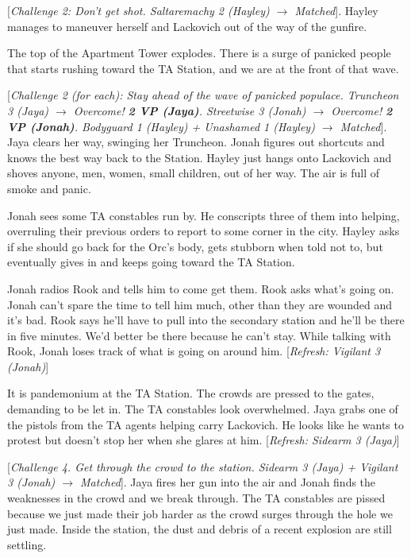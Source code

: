 {[}\textit{Challenge 2: Don't get shot.  Saltaremachy 2 (Hayley) $\rightarrow$ Matched}{]}.  Hayley manages to maneuver herself and Lackovich out of the way of the gunfire.



The top of the Apartment Tower explodes.  There is a surge of panicked people that starts rushing toward the TA Station, and we are at the front of that wave.



{[}\textit{Challenge 2 (for each): Stay ahead of the wave of panicked populace.   Truncheon 3 (Jaya)  $\rightarrow$ Overcome! }\textit{\textbf{2 VP (Jaya)}}\textit{.  Streetwise 3  (Jonah) $\rightarrow$ Overcome! }\textit{\textbf{2 VP (Jonah)}}\textit{. Bodyguard 1 (Hayley) + Unashamed 1 (Hayley)  $\rightarrow$ Matched}{]}.  Jaya clears her way, swinging her Truncheon.  Jonah figures out shortcuts and knows the best way back to the Station.  Hayley just hangs onto Lackovich and shoves anyone, men, women, small children, out of her way.  The air is full of smoke and panic.



Jonah sees some TA constables run by.  He conscripts three of them into helping, overruling their previous orders to report to some corner in the city.  Hayley asks if she should go back for the Orc's body, gets stubborn when told not to, but eventually gives in and keeps going toward the TA Station.



Jonah radios Rook and tells him to come get them.  Rook asks what's going on.  Jonah can't spare the time to tell him much, other than they are wounded and it's bad.  Rook says he'll have to pull into the secondary station and he'll be there in five minutes.  We'd better be there because he can't stay.  While talking with Rook, Jonah loses track of what is going on around him.  {[}\textit{Refresh: Vigilant 3 (Jonah)}{]}



It is pandemonium at the TA Station.  The crowds are pressed to the gates, demanding to be let in.  The TA constables look overwhelmed.  Jaya grabs one of the pistols from the TA agents helping carry Lackovich.  He looks like he wants to protest but doesn't stop her when she glares at him. {[}\textit{Refresh: Sidearm 3 (Jaya)}{]}



{[}\textit{Challenge 4.  Get through the crowd to the station.  Sidearm 3 (Jaya) + Vigilant 3 (Jonah)  $\rightarrow$ Matched}{]}.  Jaya fires her gun into the air and Jonah finds the weaknesses in the crowd and we break through.  The TA constables are pissed because we just made their job harder as the crowd surges through the hole we just made.  Inside the station, the dust and debris of a recent explosion are still settling.



